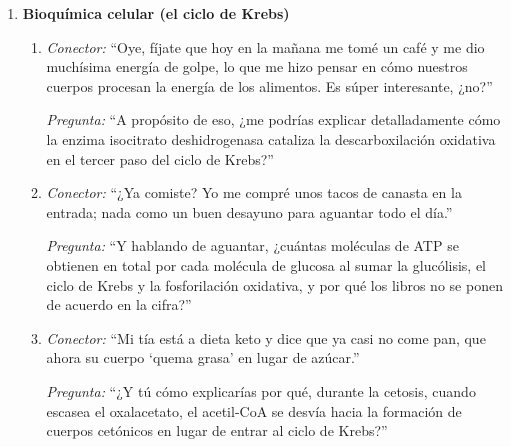 \begin{enumerate}[label=\textbf{Tema \arabic*.}, wide=0pt, leftmargin=0pt, itemsep=0.6em]

  \item \textbf{Bioquímica celular (el ciclo de Krebs)}
  \begin{enumerate}[label=\alph*), leftmargin=1.8em, itemsep=0.3em]
    \item \textit{Conector:} \enquote{Oye, fíjate que hoy en la mañana me tomé un café y me dio muchísima energía de golpe, lo que me hizo pensar en cómo nuestros cuerpos procesan la energía de los alimentos. Es súper interesante, ¿no?}\par
    \textit{Pregunta:} \enquote{A propósito de eso, ¿me podrías explicar detalladamente cómo la enzima isocitrato deshidrogenasa cataliza la descarboxilación oxidativa en el tercer paso del ciclo de Krebs?}
    \item \textit{Conector:} \enquote{¿Ya comiste? Yo me compré unos tacos de canasta en la entrada; nada como un buen desayuno para aguantar todo el día.}\par
    \textit{Pregunta:} \enquote{Y hablando de aguantar, ¿cuántas moléculas de ATP se obtienen en total por cada molécula de glucosa al sumar la glucólisis, el ciclo de Krebs y la fosforilación oxidativa, y por qué los libros no se ponen de acuerdo en la cifra?}
    \item \textit{Conector:} \enquote{Mi tía está a dieta keto y dice que ya casi no come pan, que ahora su cuerpo \enquote{quema grasa} en lugar de azúcar.}\par
    \textit{Pregunta:} \enquote{¿Y tú cómo explicarías por qué, durante la cetosis, cuando escasea el oxalacetato, el acetil-CoA se desvía hacia la formación de cuerpos cetónicos en lugar de entrar al ciclo de Krebs?}
  \end{enumerate}


\end{enumerate}
